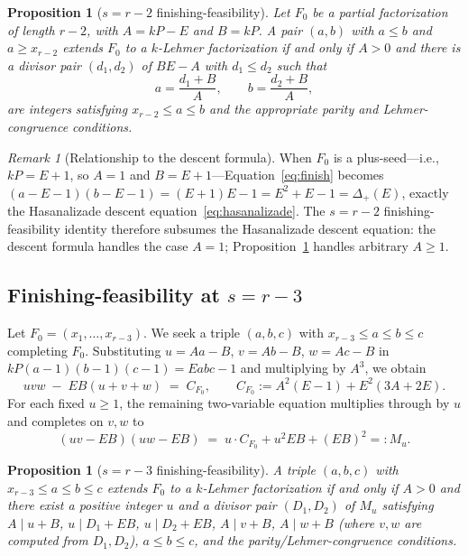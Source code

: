 \documentclass[11pt]{article}
\newtheorem{proposition}[theorem]{Proposition}
\theoremstyle{definition}
\theoremstyle{remark}
\newtheorem{remark}[theorem]{Remark}
\begin{document}
\begin{proposition}[$s = r - 2$ finishing-feasibility]\label{prop:rm2}
Let $F_0$ be a partial factorization of length $r - 2$, with $A = kP - E$
and $B = kP$.  A pair $(a, b)$ with $a \le b$ and $a \ge x_{r-2}$ extends
$F_0$ to a $k$-Lehmer factorization if and only if $A > 0$ and there is
a divisor pair $(d_1, d_2)$ of $BE - A$ with $d_1 \le d_2$ such that
\[
  a = \frac{d_1 + B}{A},
  \qquad
  b = \frac{d_2 + B}{A},
\]
are integers satisfying $x_{r-2} \le a \le b$ and the appropriate
parity and Lehmer-congruence conditions.
\end{proposition}

\begin{remark}[Relationship to the descent formula]
When $F_0$ is a plus-seed---i.e., $kP = E + 1$, so $A = 1$ and
$B = E + 1$---Equation~\eqref{eq:finish} becomes
$(a - E - 1)(b - E - 1) = (E + 1) E - 1 = E^2 + E - 1 = \Delta_+(E)$,
exactly the Hasanalizade descent equation~\eqref{eq:hasanalizade}.  The
$s = r - 2$ finishing-feasibility identity therefore subsumes the
Hasanalizade descent equation: the descent formula handles the case
$A = 1$; Proposition~\ref{prop:rm2} handles arbitrary $A \ge 1$.
\end{remark}

\subsection{Finishing-feasibility at $s = r - 3$}

Let $F_0 = (x_1, \ldots, x_{r-3})$.  We seek a triple $(a, b, c)$
with $x_{r-3} \le a \le b \le c$ completing $F_0$.  Substituting
$u = Aa - B$, $v = Ab - B$, $w = Ac - B$ in
$kP(a-1)(b-1)(c-1) = Eabc - 1$ and multiplying by $A^3$, we obtain
\begin{equation}\label{eq:3var-uvw}
  uvw \;-\; EB(u + v + w) \;=\; C_{F_0},
  \qquad
  C_{F_0} := A^2(E - 1) + E^2(3A + 2E).
\end{equation}
For each fixed $u \ge 1$, the remaining two-variable equation
multiplies through by $u$ and completes on $v, w$ to
\begin{equation}\label{eq:3var-fixed-u}
  (u v - EB)(u w - EB) \;=\; u \cdot C_{F_0} + u^2 EB + (EB)^2 =: M_u.
\end{equation}

\begin{proposition}[$s = r - 3$ finishing-feasibility]\label{prop:rm3}
A triple $(a, b, c)$ with $x_{r-3} \le a \le b \le c$ extends $F_0$
to a $k$-Lehmer factorization if and only if $A > 0$ and there exist
a positive integer $u$ and a divisor pair $(D_1, D_2)$ of $M_u$
satisfying $A \mid u + B$, $u \mid D_1 + EB$, $u \mid D_2 + EB$,
$A \mid v + B$, $A \mid w + B$ (where $v, w$ are computed from $D_1,
D_2$), $a \le b \le c$, and the parity/Lehmer-congruence conditions.
\end{proposition}
\end{document}
